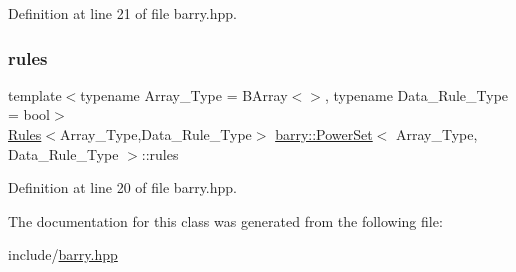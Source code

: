 Definition at line 21 of file barry.\+hpp.

\mbox{\label{classbarry_1_1_power_set_ad5486f771bb3161b951100192ce1b2e5}} 
\subsubsection{\texorpdfstring{rules}{rules}}
{\footnotesize\ttfamily template$<$typename Array\+\_\+\+Type  = B\+Array$<$$>$, typename Data\+\_\+\+Rule\+\_\+\+Type  = bool$>$ \\
\hyperlink{classbarry_1_1_rules}{Rules}$<$Array\+\_\+\+Type,Data\+\_\+\+Rule\+\_\+\+Type$>$ \hyperlink{classbarry_1_1_power_set}{barry\+::\+Power\+Set}$<$ Array\+\_\+\+Type, Data\+\_\+\+Rule\+\_\+\+Type $>$\+::rules}



Definition at line 20 of file barry.\+hpp.



The documentation for this class was generated from the following file\+:\begin{DoxyCompactItemize}
\item 
include/\hyperlink{barry_8hpp}{barry.\+hpp}\end{DoxyCompactItemize}
